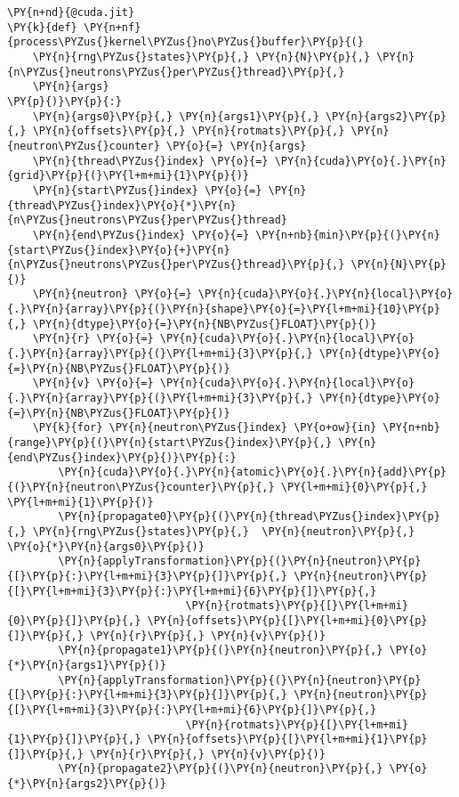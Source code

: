 \begin{Verbatim}[commandchars=\\\{\},fontsize=\tiny]
\PY{n+nd}{@cuda.jit}
\PY{k}{def} \PY{n+nf}{process\PYZus{}kernel\PYZus{}no\PYZus{}buffer}\PY{p}{(}
    \PY{n}{rng\PYZus{}states}\PY{p}{,} \PY{n}{N}\PY{p}{,} \PY{n}{n\PYZus{}neutrons\PYZus{}per\PYZus{}thread}\PY{p}{,}
    \PY{n}{args}
\PY{p}{)}\PY{p}{:}
    \PY{n}{args0}\PY{p}{,} \PY{n}{args1}\PY{p}{,} \PY{n}{args2}\PY{p}{,} \PY{n}{offsets}\PY{p}{,} \PY{n}{rotmats}\PY{p}{,} \PY{n}{neutron\PYZus{}counter} \PY{o}{=} \PY{n}{args}
    \PY{n}{thread\PYZus{}index} \PY{o}{=} \PY{n}{cuda}\PY{o}{.}\PY{n}{grid}\PY{p}{(}\PY{l+m+mi}{1}\PY{p}{)}
    \PY{n}{start\PYZus{}index} \PY{o}{=} \PY{n}{thread\PYZus{}index}\PY{o}{*}\PY{n}{n\PYZus{}neutrons\PYZus{}per\PYZus{}thread}
    \PY{n}{end\PYZus{}index} \PY{o}{=} \PY{n+nb}{min}\PY{p}{(}\PY{n}{start\PYZus{}index}\PY{o}{+}\PY{n}{n\PYZus{}neutrons\PYZus{}per\PYZus{}thread}\PY{p}{,} \PY{n}{N}\PY{p}{)}
    \PY{n}{neutron} \PY{o}{=} \PY{n}{cuda}\PY{o}{.}\PY{n}{local}\PY{o}{.}\PY{n}{array}\PY{p}{(}\PY{n}{shape}\PY{o}{=}\PY{l+m+mi}{10}\PY{p}{,} \PY{n}{dtype}\PY{o}{=}\PY{n}{NB\PYZus{}FLOAT}\PY{p}{)}
    \PY{n}{r} \PY{o}{=} \PY{n}{cuda}\PY{o}{.}\PY{n}{local}\PY{o}{.}\PY{n}{array}\PY{p}{(}\PY{l+m+mi}{3}\PY{p}{,} \PY{n}{dtype}\PY{o}{=}\PY{n}{NB\PYZus{}FLOAT}\PY{p}{)}
    \PY{n}{v} \PY{o}{=} \PY{n}{cuda}\PY{o}{.}\PY{n}{local}\PY{o}{.}\PY{n}{array}\PY{p}{(}\PY{l+m+mi}{3}\PY{p}{,} \PY{n}{dtype}\PY{o}{=}\PY{n}{NB\PYZus{}FLOAT}\PY{p}{)}
    \PY{k}{for} \PY{n}{neutron\PYZus{}index} \PY{o+ow}{in} \PY{n+nb}{range}\PY{p}{(}\PY{n}{start\PYZus{}index}\PY{p}{,} \PY{n}{end\PYZus{}index}\PY{p}{)}\PY{p}{:}
        \PY{n}{cuda}\PY{o}{.}\PY{n}{atomic}\PY{o}{.}\PY{n}{add}\PY{p}{(}\PY{n}{neutron\PYZus{}counter}\PY{p}{,} \PY{l+m+mi}{0}\PY{p}{,} \PY{l+m+mi}{1}\PY{p}{)}
        \PY{n}{propagate0}\PY{p}{(}\PY{n}{thread\PYZus{}index}\PY{p}{,} \PY{n}{rng\PYZus{}states}\PY{p}{,}  \PY{n}{neutron}\PY{p}{,} \PY{o}{*}\PY{n}{args0}\PY{p}{)}
        \PY{n}{applyTransformation}\PY{p}{(}\PY{n}{neutron}\PY{p}{[}\PY{p}{:}\PY{l+m+mi}{3}\PY{p}{]}\PY{p}{,} \PY{n}{neutron}\PY{p}{[}\PY{l+m+mi}{3}\PY{p}{:}\PY{l+m+mi}{6}\PY{p}{]}\PY{p}{,} 
                            \PY{n}{rotmats}\PY{p}{[}\PY{l+m+mi}{0}\PY{p}{]}\PY{p}{,} \PY{n}{offsets}\PY{p}{[}\PY{l+m+mi}{0}\PY{p}{]}\PY{p}{,} \PY{n}{r}\PY{p}{,} \PY{n}{v}\PY{p}{)}
        \PY{n}{propagate1}\PY{p}{(}\PY{n}{neutron}\PY{p}{,} \PY{o}{*}\PY{n}{args1}\PY{p}{)}
        \PY{n}{applyTransformation}\PY{p}{(}\PY{n}{neutron}\PY{p}{[}\PY{p}{:}\PY{l+m+mi}{3}\PY{p}{]}\PY{p}{,} \PY{n}{neutron}\PY{p}{[}\PY{l+m+mi}{3}\PY{p}{:}\PY{l+m+mi}{6}\PY{p}{]}\PY{p}{,} 
                            \PY{n}{rotmats}\PY{p}{[}\PY{l+m+mi}{1}\PY{p}{]}\PY{p}{,} \PY{n}{offsets}\PY{p}{[}\PY{l+m+mi}{1}\PY{p}{]}\PY{p}{,} \PY{n}{r}\PY{p}{,} \PY{n}{v}\PY{p}{)}
        \PY{n}{propagate2}\PY{p}{(}\PY{n}{neutron}\PY{p}{,} \PY{o}{*}\PY{n}{args2}\PY{p}{)}


\end{Verbatim}
